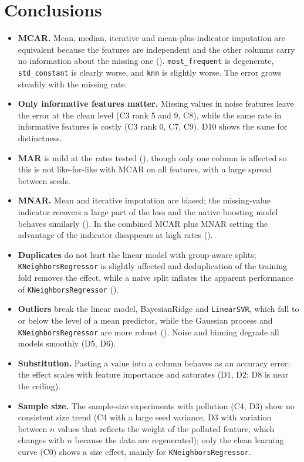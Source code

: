 \documentclass{Configuration_Files/PoliMi3i_thesis}
\begin{document}
\section{Conclusions}
\label{sec:conclusions}%
\begin{itemize}
    \item \textbf{MCAR.} Mean, median, iterative and mean-plus-indicator imputation are equivalent because the features are independent and the other columns carry no information about the missing one (). \texttt{most\_frequent} is degenerate, \texttt{std\_constant} is clearly worse, and \texttt{knn} is slightly worse. The error grows steadily with the missing rate.
    \item \textbf{Only informative features matter.} Missing values in noise features leave the error at the clean level (C3 rank 5 and 9, C8), while the same rate in informative features is costly (C3 rank 0, C7, C9). D10 shows the same for distinctness.
    \item \textbf{MAR} is mild at the rates tested (), though only one column is affected so this is not like-for-like with MCAR on all features, with a large spread between seeds.
    \item \textbf{MNAR.} Mean and iterative imputation are biased; the missing-value indicator recovers a large part of the loss and the native boosting model behaves similarly (). In the combined MCAR plus MNAR setting the advantage of the indicator disappears at high rates ().
    \item \textbf{Duplicates} do not hurt the linear model with group-aware splits; \texttt{K\allowbreak Neighbors\allowbreak Regressor} is slightly affected and deduplication of the training fold removes the effect, while a naive split inflates the apparent performance of \texttt{K\allowbreak Neighbors\allowbreak Regressor} ().
    \item \textbf{Outliers} break the linear model, BayesianRidge and \texttt{LinearSVR}, which fall to or below the level of a mean predictor, while the Gaussian process and \texttt{K\allowbreak Neighbors\allowbreak Regressor} are more robust (). Noise and binning degrade all models smoothly (D5, D6).
    \item \textbf{Substitution.} Pasting a value into a column behaves as an accuracy error: the effect scales with feature importance and saturates (D1, D2; D8 is near the ceiling).
    \item \textbf{Sample size.} The sample-size experiments with pollution (C4, D3) show no consistent size trend (C4 with a large seed variance, D3 with variation between $n$ values that reflects the weight of the polluted feature, which changes with $n$ because the data are regenerated); only the clean learning curve (C0) shows a size effect, mainly for \texttt{K\allowbreak Neighbors\allowbreak Regressor}.
\end{itemize}
\end{document}
